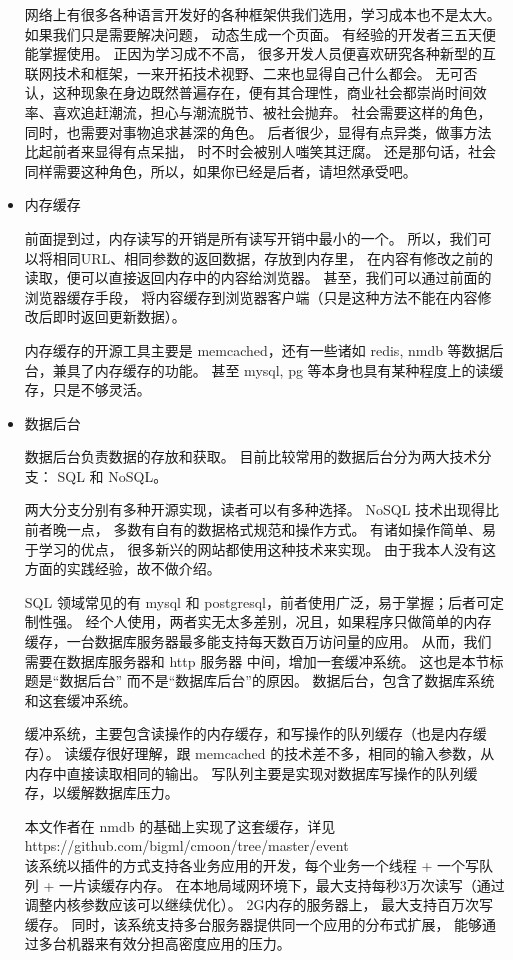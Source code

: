 \documentclass{article}
\begin{document}
\begin{itemize}
    网络上有很多各种语言开发好的各种框架供我们选用，学习成本也不是太大。 如果我们只是需要解决问题，
    动态生成一个页面。 有经验的开发者三五天便能掌握使用。 正因为学习成不不高，
    很多开发人员便喜欢研究各种新型的互联网技术和框架，一来开拓技术视野、二来也显得自己什么都会。
    无可否认，这种现象在身边既然普遍存在，便有其合理性，商业社会都崇尚时间效率、喜欢追赶潮流，担心与潮流脱节、被社会抛弃。
    社会需要这样的角色，同时，也需要对事物追求甚深的角色。 后者很少，显得有点异类，做事方法比起前者来显得有点呆拙，
    时不时会被别人嗤笑其迂腐。 还是那句话，社会同样需要这种角色，所以，如果你已经是后者，请坦然承受吧。

  \item 内存缓存

    前面提到过，内存读写的开销是所有读写开销中最小的一个。 所以，我们可以将相同URL、相同参数的返回数据，存放到内存里，
    在内容有修改之前的读取，便可以直接返回内存中的内容给浏览器。 甚至，我们可以通过前面的浏览器缓存手段，
    将内容缓存到浏览器客户端（只是这种方法不能在内容修改后即时返回更新数据）。

    内存缓存的开源工具主要是 memcached，还有一些诸如 redis, nmdb 等数据后台，兼具了内存缓存的功能。
    甚至 mysql, pg 等本身也具有某种程度上的读缓存，只是不够灵活。
    
  \item 数据后台

    数据后台负责数据的存放和获取。 目前比较常用的数据后台分为两大技术分支： SQL 和 NoSQL。

    两大分支分别有多种开源实现，读者可以有多种选择。 NoSQL 技术出现得比前者晚一点，
    多数有自有的数据格式规范和操作方式。 有诸如操作简单、易于学习的优点，
    很多新兴的网站都使用这种技术来实现。 由于我本人没有这方面的实践经验，故不做介绍。

    SQL 领域常见的有 mysql 和 postgresql，前者使用广泛，易于掌握；后者可定制性强。
    经个人使用，两者实无太多差别，况且，如果程序只做简单的内存缓存，一台数据库服务器最多能支持每天数百万访问量的应用。
    从而，我们需要在数据库服务器和 http 服务器 中间，增加一套缓冲系统。
    这也是本节标题是“数据后台” 而不是“数据库后台”的原因。 数据后台，包含了数据库系统和这套缓冲系统。

    缓冲系统，主要包含读操作的内存缓存，和写操作的队列缓存（也是内存缓存）。
    读缓存很好理解，跟 memcached 的技术差不多，相同的输入参数，从内存中直接读取相同的输出。
    写队列主要是实现对数据库写操作的队列缓存，以缓解数据库压力。

    本文作者在 nmdb 的基础上实现了这套缓存，详见 \\
    https://github.com/bigml/cmoon/tree/master/event \\
    该系统以插件的方式支持各业务应用的开发，每个业务一个线程 + 一个写队列 + 一片读缓存内存。
    在本地局域网环境下，最大支持每秒3万次读写（通过调整内核参数应该可以继续优化）。 2G内存的服务器上，
    最大支持百万次写缓存。 同时，该系统支持多台服务器提供同一个应用的分布式扩展，
    能够通过多台机器来有效分担高密度应用的压力。


\end{itemize}
\end{document}
